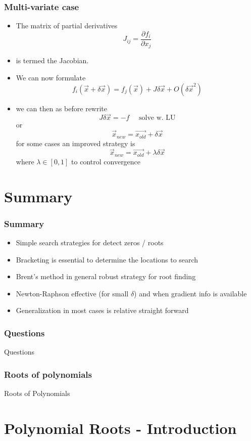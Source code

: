 \documentclass[10pt]{beamer}
\begin{document}
\begin{frame}
  \frametitle{Multi-variate case}
  \begin{itemize}
  \item The matrix of partial derivatives
    \[
      J_{ij} = \frac{\partial f_i}{\partial x_j}
    \]
  \item is termed the Jacobian. 
  \item We can now formulate
    \[
      f_i (\vec{x} + \delta\vec{x}) = f_j(\vec{x}) + J \delta \vec{x} + O(\delta\vec{x}^2)
    \]
  \item we can then as before rewrite
    \[
      J \delta \vec{x} = -f \mbox{ ~~ solve w. LU}
    \]
    or
    \[
      \vec{x}_{new} = \vec{x_{old}} + \delta \vec{x}
    \]
    for some cases an improved strategy is 
    \[
      \vec{x}_{new} = \vec{x_{old}} + \lambda \delta \vec{x}
    \] where $\lambda \in [0,1]$ to control convergence
  \end{itemize}
\end{frame}

\section{Summary}

\begin{frame}
  \frametitle{Summary}
  \begin{itemize}
  \item Simple search strategies for detect zeros / roots
  \item Bracketing is essential to determine the locations to search
  \item Brent's method in general robust strategy for root finding
  \item Newton-Raphson effective (for small $\delta$) and when gradient info is available
  \item Generalization in most cases is relative straight forward
  \end{itemize}
\end{frame}

\begin{frame}
  \frametitle{Questions}
  \centerline{\Huge Questions}
\end{frame}

\begin{frame}[plain]
  \frametitle{Roots of polynomials}
  \centerline{\Huge Roots of Polynomials}
\end{frame}

\section{Polynomial Roots - Introduction}
\end{document}
